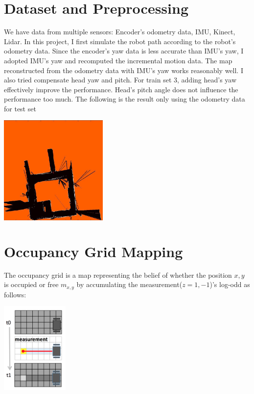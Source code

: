 \documentclass[letterpaper,twocolumn,10pt]{article}
\begin{document}
\section{Dataset and Preprocessing}

We have data from multiple sensors: Encoder's odometry data, IMU, Kinect, Lidar. In this project, I first simulate the robot path according to the robot's odometry data. Since the encoder's yaw data is less accurate than IMU's yaw, I adopted IMU's yaw and recomputed the incremental motion data. The map reconstructed from the odometry data with IMU's yaw works reasonably well. I also tried compensate head yaw and pitch. For train set 3, adding head's yaw effectively improve the performance. Head's pitch angle does not influence the performance too much. The following is the result only using the odometry data for test set\\

\begin{center}
\includegraphics[width=0.4\textwidth]{results/test_odometry.jpg}
\end{center}


\section{Occupancy Grid Mapping~\cite{thrun2002robotic}}
The occupancy grid is a map representing the belief of whether the position $x,y$ is occupied or free  $m_{x,y}$ by accumulating the measurement($z = {1,-1}$)'s log-odd as follows:\\
\begin{center}
\includegraphics[width=0.25\textwidth]{imgs/lidar}
\end{center}
\end{document}
